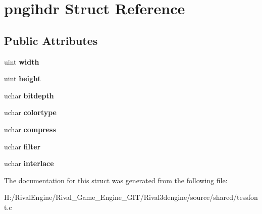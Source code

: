 \hypertarget{structpngihdr}{}\section{pngihdr Struct Reference}
\label{structpngihdr}
\subsection*{Public Attributes}
\begin{DoxyCompactItemize}
\item 
\mbox{\label{structpngihdr_a082accc1d8fae24d0a4015264ae1665e}} 
uint {\bfseries width}
\item 
\mbox{\label{structpngihdr_ad9080e8ab0f66a8827df83d1a3869544}} 
uint {\bfseries height}
\item 
\mbox{\label{structpngihdr_add3aebf3e2905afb698b51699bd84e42}} 
uchar {\bfseries bitdepth}
\item 
\mbox{\label{structpngihdr_ac6aec0c44daeea95a820ec0554d3e76f}} 
uchar {\bfseries colortype}
\item 
\mbox{\label{structpngihdr_a6d02ee7a12d3ce7a2fd8d99694782949}} 
uchar {\bfseries compress}
\item 
\mbox{\label{structpngihdr_a200592842e8f5bebedc5cb4f4e18a896}} 
uchar {\bfseries filter}
\item 
\mbox{\label{structpngihdr_a69cfaf720813259d71a7b598829c6ad6}} 
uchar {\bfseries interlace}
\end{DoxyCompactItemize}


The documentation for this struct was generated from the following file\+:\begin{DoxyCompactItemize}
\item 
H\+:/\+Rival\+Engine/\+Rival\+\_\+\+Game\+\_\+\+Engine\+\_\+\+G\+I\+T/\+Rival3dengine/source/shared/tessfont.\+c\end{DoxyCompactItemize}
